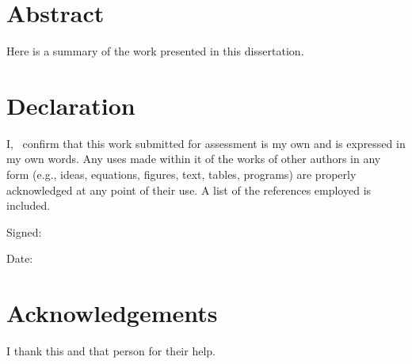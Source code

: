 \thispagestyle{plain}

\section*{Abstract} %
Here is a summary of the work presented in this dissertation.

\section*{Declaration}
I, \docAuthor\ confirm that this work submitted for assessment is my own and is expressed in my own words. Any uses made within it of the works of other authors in any form (e.g., ideas, equations, figures, text, tables, programs) are properly acknowledged at any point of their use. A list of the references employed is included.

Signed:

Date:

\section*{Acknowledgements}
I thank this and that person for their help.


